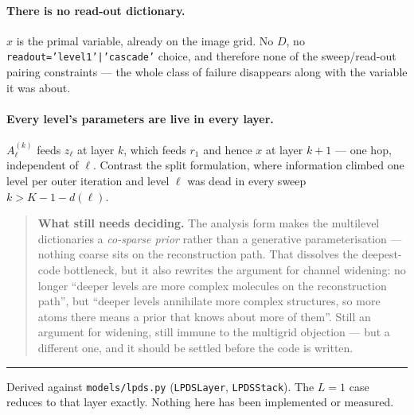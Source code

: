 \documentclass[11pt]{article}
\begin{document}
\paragraph{There is no read-out dictionary.}
$\hat x$ is the primal variable, already on the image grid. No $D$, no
\texttt{readout='level1'|'cascade'} choice, and therefore none of the sweep/read-out pairing constraints ---
the whole class of failure disappears along with the variable it was about.

\paragraph{Every level's parameters are live in every layer.}
$A_\ell^{(k)}$ feeds $z_\ell$ at layer $k$, which feeds $r_1$ and hence $x$ at layer $k+1$ --- one hop,
independent of $\ell$. Contrast the split formulation, where information climbed one level per outer
iteration and level $\ell$ was dead in every sweep $k > K-1-d(\ell)$.

\begin{quote}\color{accent}
\textbf{What still needs deciding.} The analysis form makes the multilevel dictionaries a \emph{co-sparse
prior} rather than a generative parameterisation --- nothing coarse sits on the reconstruction path. That
dissolves the deepest-code bottleneck, but it also rewrites the argument for channel widening: no longer
``deeper levels are more complex molecules on the reconstruction path'', but ``deeper levels annihilate more
complex structures, so more atoms there means a prior that knows about more of them''. Still an argument for
widening, still immune to the multigrid objection --- but a different one, and it should be settled before
the code is written.
\end{quote}

\vspace{1em}
\hrule
\vspace{0.5em}
\noindent\textcolor{faint}{\footnotesize Derived against \texttt{models/lpds.py}
(\texttt{LPDSLayer}, \texttt{LPDSStack}). The $L=1$ case reduces to that layer exactly.
Nothing here has been implemented or measured.}
\end{document}
